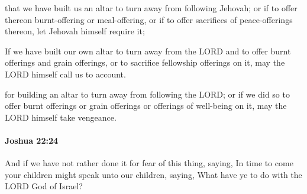 			\begin{versebox}
					\item[BHS] 
					\item[ASV] that we have built us an altar to turn away from following Jehovah; or if to offer thereon burnt-offering or meal-offering, or if to offer sacrifices of peace-offerings thereon, let Jehovah himself require it;
					\item[NIV] If we have built our own altar to turn away from the LORD and to offer burnt offerings and grain offerings, or to sacrifice fellowship offerings on it, may the LORD himself call us to account.
					\item[NRSV] for building an altar to turn away from following the LORD; or if we did so to offer burnt offerings or grain offerings or offerings of well-being on it, may the LORD himself take vengeance.
			\end{versebox}

		\paragraph{Joshua 22:24} %
			\label{JOSHUA-22-24}

			And if we have not rather done it for fear of this thing, saying, In time to come your children might speak unto our children, saying, What have ye to do with the LORD God of Israel?

